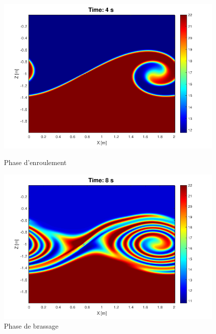 \documentclass{rapportECC}
\begin{document}
\begin{figure}[htbp]
\begin{minipage}{0.45\textwidth}
        \includegraphics[width=\linewidth]{images/KHI2.png}
        \caption{Phase d'enroulement}
        \label{fig:KHI2}
    \end{minipage}
    \begin{minipage}{0.45\textwidth}
        \centering
        \includegraphics[width=\linewidth]{images/KHI3.png}
        \caption{Phase de brassage}
        \label{fig:KHI3}
    \end{minipage}
    \hspace{0.05\textwidth} %
    \begin{minipage}{0.45\textwidth}
        \centering

\end{minipage}
\end{figure}
\end{document}
